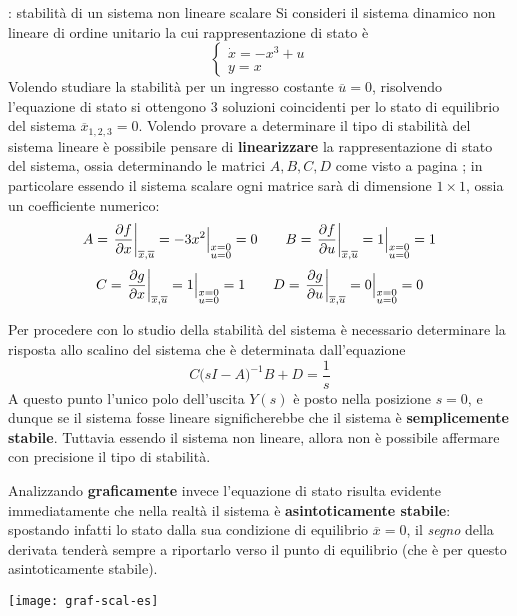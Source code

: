 		\begin{esempio}{: stabilità di un sistema non lineare scalare}
			Si consideri il sistema dinamico non lineare di ordine unitario la cui rappresentazione di stato è
			\[ \begin{cases}
				\dot x = - x^3 + u \\ y = x
			\end{cases} \]
			Volendo studiare la stabilità per un ingresso costante $\overline u = 0$, risolvendo l'equazione di stato si ottengono 3 soluzioni coincidenti per lo stato di equilibrio del sistema $\overline x_{1,2,3} = 0$. Volendo provare a determinare il tipo di stabilità del sistema lineare è possibile pensare di \textbf{linearizzare} la rappresentazione di stato del sistema, ossia determinando le matrici $A,B,C,D$ come visto a pagina \pageref{sec:intro:linearizzazione}; in particolare essendo il sistema scalare ogni matrice sarà di dimensione $1\times 1$, ossia un coefficiente numerico:
			\[ A = \left. \frac{\partial f}{\partial x}\right|_{\overline x,\overline u} = - 3x^2 \Big|_{\substack{x = 0 \\ u = 0}} = 0 \qquad
			B = \left. \frac{\partial f}{\partial u}\right|_{\overline x,\overline u} = 1 \Big|_{\substack{x = 0 \\ u = 0}} = 1 \]
			\[ C = \left. \frac{\partial g}{\partial x}\right|_{\overline x,\overline u} = 1 \Big|_{\substack{x = 0 \\ u = 0}} = 1 \qquad 
			D = \left. \frac{\partial g}{\partial u}\right|_{\overline x,\overline u} = 0 \Big|_{\substack{x = 0 \\ u = 0}} = 0 \]
			
			Per procedere con lo studio della stabilità del sistema è necessario determinare la risposta allo scalino del sistema che è determinata dall'equazione
			\[ C\big(sI-A\big)^{-1} B +  D = \frac 1 s \]
			A questo punto l'unico polo dell'uscita $Y(s)$ è posto nella posizione $s=0$, e dunque se il sistema fosse lineare significherebbe che il sistema è \textbf{semplicemente stabile}. Tuttavia essendo il sistema non lineare, allora non è possibile affermare con precisione il tipo di stabilità. 
			\begin{multicols}{2}
			Analizzando \textbf{graficamente} invece l'equazione di stato risulta evidente immediatamente che nella realtà il sistema è \textbf{asintoticamente stabile}: spostando infatti lo stato dalla sua condizione di equilibrio $\overline x=0$, il \textit{segno} della derivata tenderà sempre a riportarlo verso il punto di equilibrio (che è per questo asintoticamente stabile).
			
			\begin{center}
				\texttt{[image: graf-scal-es]}
			\end{center}
		\end{multicols}
		
		\end{esempio}
		

